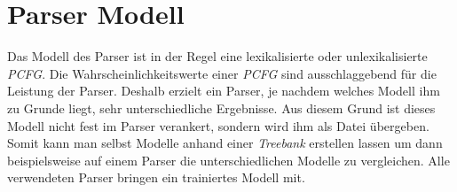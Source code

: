 \section{Parser Modell}
Das Modell des Parser ist in der Regel eine lexikalisierte oder unlexikalisierte \textit{PCFG}. Die Wahrscheinlichkeitswerte einer \textit{PCFG} sind ausschlaggebend für die Leistung der Parser. Deshalb  erzielt ein Parser, je nachdem welches Modell ihm zu Grunde liegt, sehr unterschiedliche Ergebnisse. Aus diesem Grund ist dieses Modell nicht fest im Parser verankert, sondern wird ihm als Datei übergeben. Somit kann man selbst Modelle anhand einer \textit{Treebank} erstellen lassen um dann beispielsweise auf einem Parser die unterschiedlichen Modelle zu vergleichen. Alle verwendeten Parser bringen ein trainiertes Modell mit.  %

